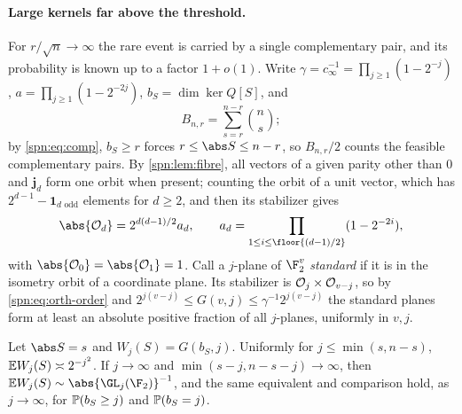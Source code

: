 \paragraph{Large kernels far above the threshold.}
For $r/\sqrt n\to\infty$ the rare event is carried by a single complementary pair, and its
probability is known up to a factor $1+o(1)$. Write $\gamma=c_\infty^{-1}=\prod_{j\ge1}(1-2^{-j})$,
$a=\prod_{j\ge1}(1-2^{-2j})$, $b_S=\dim\ker Q[S]$, and
\[
 B_{n,r}=\sum_{s=r}^{n-r}\binom ns ;
\]
by \eqref{spn:eq:comp}, $b_S\ge r$ forces $r\le\abs S\le n-r$, so $B_{n,r}/2$ counts the feasible
complementary pairs. By \cref{spn:lem:fibre}, all vectors of a given parity other than $0$ and
$\mathbf j_d$ form one orbit when present; counting the orbit of a unit vector, which has
$2^{d-1}-\mathbf 1_{d\text{ odd}}$ elements for $d\ge2$, and then its stabilizer gives
\begin{equation}\label{spn:eq:orth-order}
 \abs{\spnOrth_d}=2^{d(d-1)/2}a_d,\qquad a_d=\prod_{1\le i\le\floor{(d-1)/2}}(1-2^{-2i}),
\end{equation}
with $\abs{\spnOrth_0}=\abs{\spnOrth_1}=1$. Call a $j$-plane of $\F_2^v$ \emph{standard} if it is
in the isometry orbit of a coordinate plane. Its stabilizer is $\mathcal{O}_j\times\mathcal{O}_{v-j}$,
so by \eqref{spn:eq:orth-order} and $2^{j(v-j)}\le G(v,j)\le\gamma^{-1}2^{j(v-j)}$ the standard
planes form at least an absolute positive fraction of all $j$-planes, uniformly in $v,j$.

\begin{lemma}\label{spn:lem:onesupport}
Let $\abs S=s$ and $W_j(S)=G(b_S,j)$. Uniformly for $j\le\min(s,n-s)$,
$\mathbb{E} W_j(S)\asymp2^{-j^2}$. If $j\to\infty$ and $\min(s-j,n-s-j)\to\infty$, then
$\spnE W_j(S)\sim\abs{\GL_j(\F_2)}^{-1}$, and the same equivalent and comparison hold, as
$j\to\infty$, for $\mathbb{P}(b_S\ge j)$ and $\mathbb{P}(b_S=j)$.
\end{lemma}

